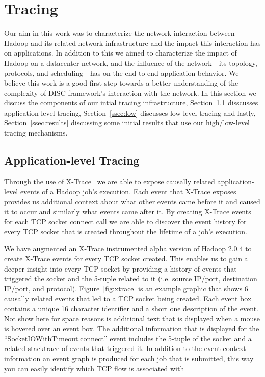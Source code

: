 \section{Tracing}
\label{sec:tracing}
Our aim in this work was to characterize the network interaction 
between Hadoop and its related network infrastructure and the impact this 
interaction has on applications. In addition to this we aimed to 
characterize the impact of Hadoop on a datacenter network, and the 
influence of the network - its topology, protocols, and scheduling - has on the 
end-to-end application behavior. We believe this work is a good first step 
towards a better understanding of the complexity of DISC framework's interaction
with the network. In this section we discuss the components of our intial tracing
infrastructure, Section~\ref{ssec:app} disscusses application-level tracing, 
Section~\ref{ssec:low} discusses low-level tracing and lastly, 
Section~\ref{ssec:results} discussing some initial results that use our high/low-level
tracing mechanisms.

\subsection{Application-level Tracing}
\label{ssec:app}
Through the use of X-Trace~\cite{xtrace} we are able to expose causally related 
application-level events of a Hadoop job's execution. Each event that X-Trace
exposes provides us additional context about what other events came before it and
caused it to occur and similarly what events came after it. By creating X-Trace 
events for each TCP socket connect call we are able to discover the event history
for every TCP socket that is created throughout the lifetime of a job's execution.

We have augmented an X-Trace instrumented alpha version of Hadoop 2.0.4 to create 
X-Trace events for every TCP socket created. This enables us to gain a deeper insight
into every TCP socket by providing a history of events that triggered the socket and
the 5-tuple related to it (i.e. source IP/port, destination IP/port, and protocol).
Figure~\ref{fig:xtrace} is an example graphic that shows 6 causally related events that
led to a TCP socket being created. Each event box contains a unique 16 character 
identifier and a short one description of the event. Not show here for space reasons is
additional text that is displayed when a mouse is hovered over an event box. The additional
information that is displayed for the ``SocketIOWithTimeout.connect{}'' event includes
the 5-tuple of the socket and a related stacktrace of events that triggered it. In addition
to the event context information an event graph is produced for each job that is submitted,
this way you can easily identify which TCP flow is associated with 

